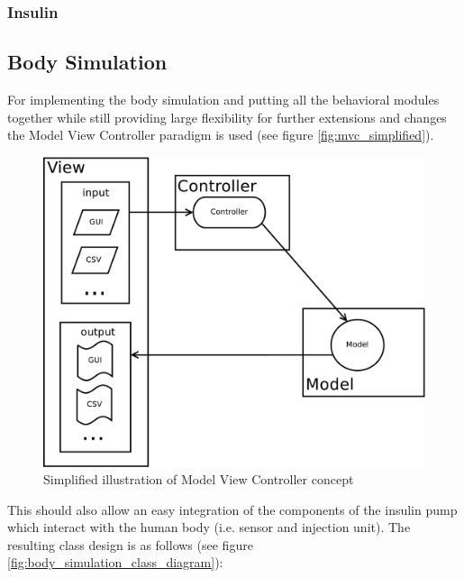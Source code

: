 \newpage
\subsubsection{Insulin}

\subsection{Body Simulation}
For implementing the body simulation and putting all the behavioral modules
together while still providing large flexibility for further extensions and
changes the Model View Controller paradigm is used (see figure
\vref{fig:mvc_simplified}). 

\begin{figure}[htb]
\centering
\includegraphics[scale=0.4]{images/mvc_simplified}
\caption{Simplified illustration of Model View Controller concept}
\label{fig:mvc_simplified}
\end{figure}

This should also allow an easy integration of the
components of the insulin pump which interact with the human body (i.e. sensor
and injection unit).
The resulting class design is as follows  (see figure
\vref{fig:body_simulation_class_diagram}): 

